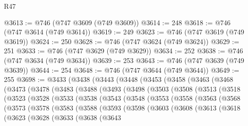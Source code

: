 \begin{lexlean}{R47}
\begin{coremodule}
@3613 := @746 (@747 @3609 (@749 @3609))
@3614 := 248
@3618 := @746 (@747 @3614 (@749 @3614))
@3619 := 249
@3623 := @746 (@747 @3619 (@749 @3619))
@3624 := 250
@3628 := @746 (@747 @3624 (@749 @3624))
@3629 := 251
@3633 := @746 (@747 @3629 (@749 @3629))
@3634 := 252
@3638 := @746 (@747 @3634 (@749 @3634))
@3639 := 253
@3643 := @746 (@747 @3639 (@749 @3639))
@3644 := 254
@3648 := @746 (@747 @3644 (@749 @3644))
@3649 := 255
@3698 := @3433
    (@3438
      (@3443
        (@3448
          (@3453
            (@3458
              (@3463
                (@3468
                  (@3473
                    (@3478
                      (@3483
                        (@3488
                          (@3493
                            (@3498
                              (@3503
                                (@3508
                                  (@3513
                                    (@3518
                                      (@3523
                                        (@3528
                                          (@3533
                                            (@3538
                                              (@3543
                                                (@3548
                                                  (@3553
                                                    (@3558
                                                      (@3563
                                                        (@3568
                                                          (@3573
                                                            (@3578
                                                              (@3583
                                                                (@3588
                                                                  (@3593
                                                                    (@3598
                                                                      (@3603
                                                                        (@3608
                                                                          (@3613
                                                                            (@3618
                                                                              (@3623
                                                                                (@3628
                                                                                  (@3633
                                                                                    (@3638
                                                                                      (@3643

\end{coremodule}
\end{lexlean}
